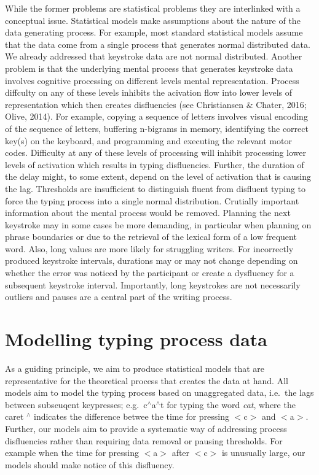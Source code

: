 \documentclass[english,jou,floatsintext]{apa7}
\begin{document}
While the former problems are statistical problems they are interlinked with a conceptual issue. Statistical models make assumptions about the nature of the data generating process. For example, most standard statistical models assume that the data come from a single process that generates normal distributed data. We already addressed that keystroke data are not normal distributed. Another problem is that the underlying mental process that generates keystroke data involves cognitive processing on different levels mental representation. Process diffculty on any of these levels inhibits the acivation flow into lower levels of representation which then creates disfluencies (see Christiansen \& Chater, 2016; Olive, 2014). For example, copying a sequence of letters involves visual encoding of the sequence of letters, buffering n-bigrams in memory, identifying the correct key(s) on the keyboard, and programming and executing the relevant motor codes. Difficulty at any of these levels of processing will inhibit processing lower levels of activation which results in typing disfluencies. Further, the duration of the delay might, to some extent, depend on the level of activation that is causing the lag. Thresholds are insufficient to distinguish fluent from disfluent typing to force the typing process into a single normal distribution. Crutially important information about the mental process would be removed. Planning the next keystroke may in some cases be more demanding, in particular when planning on phrase boundaries or due to the retrieval of the lexical form of a low frequent word. Also, long values are more likely for struggling writers. For incorrectly produced keystroke intervals, durations may or may not change depending on whether the error was noticed by the participant or create a dysfluency for a subsequent keystroke interval. Importantly, long keystrokes are not necessarily outliers and pauses are a central part of the writing process.

\hypertarget{modelling-typing-process-data}{%
\section{Modelling typing process data}\label{modelling-typing-process-data}}

As a guiding principle, we aim to produce statistical models that are representative for the theoretical process that creates the data at hand. All models aim to model the typing process based on unaggregated data, i.e.~the lags between subseuqent keypresses; e.g.~c\(^{\wedge}\)a\(^{\wedge}\)t for typing the word \emph{cat}, where the caret \(^{\wedge}\) indicates the difference betwee the time for pressing \(<\)c\(>\) and \(<\)a\(>\). Further, our models aim to provide a systematic way of addressing process disfluencies rather than requiring data removal or pausing thresholds. For example when the time for pressing \(<\)a\(>\) after \(<\)c\(>\) is unusually large, our models should make notice of this disfluency.
\end{document}
